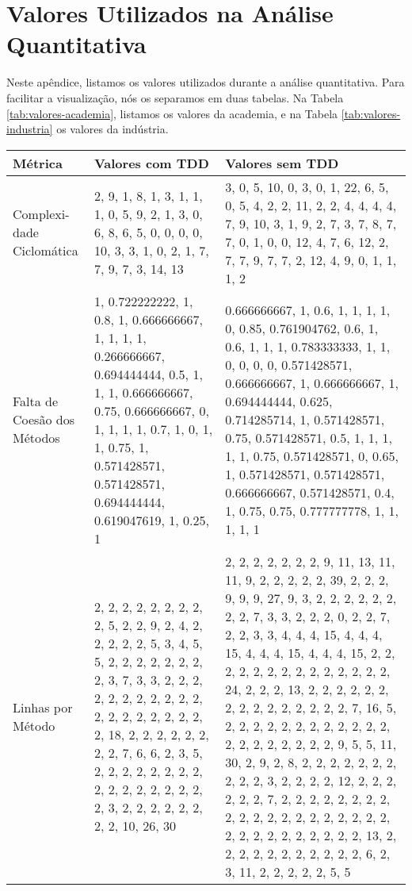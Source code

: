 \chapter{Valores Utilizados na Análise Quantitativa}
\label{ape:valores}

Neste apêndice, listamos os valores utilizados durante a 
análise quantitativa. Para facilitar a visualização, nós os separamos em duas tabelas.
Na Tabela \ref{tab:valores-academia}, listamos os valores da academia, e na Tabela
\ref{tab:valores-industria} os valores da indústria.

\begin{longtable}{| p{2cm} | p{6.5cm} | p{6.5cm} | }
		\hline
		Métrica & Valores com TDD & Valores sem TDD\\
		\hline
		Complexi- dade Ciclomática &	
		2, 9, 1, 8, 1, 3, 1, 1, 1, 0, 5, 9, 2, 1, 3, 0, 6, 8, 6, 5, 0, 0, 0, 0, 10, 3, 3, 1, 0, 2, 1, 7, 7, 9, 7, 3, 14, 13 &	
		
		3, 0, 5, 10, 0, 3, 0, 1, 22, 6, 5, 0, 5, 4, 2, 2, 11, 2, 2, 4, 4, 4, 4, 7, 9, 10, 3, 1, 9, 2, 7, 3, 7, 8, 7, 7, 0, 1, 0, 0, 12, 4, 7, 6, 12, 2, 7, 7, 9, 7, 7, 2, 12, 4, 9, 0, 1, 1, 1, 2\\
		
		\hline
		
		Falta de Coesão dos Métodos &	
		1, 0.722222222, 1, 0.8, 1, 0.666666667, 1, 1, 1, 1, 0.266666667, 0.694444444, 0.5, 1, 1, 1, 0.666666667, 0.75, 0.666666667, 0, 1, 1, 1, 1, 0.7, 1, 0, 1, 1, 0.75, 1, 0.571428571, 0.571428571, 0.694444444, 0.619047619, 1, 0.25, 1 &	
		
		0.666666667, 1, 0.6, 1, 1, 1, 1, 0, 0.85, 0.761904762, 0.6, 1, 0.6, 1, 1, 1, 0.783333333, 1, 1, 0, 0, 0, 0, 0.571428571, 0.666666667, 1, 0.666666667, 1, 0.694444444, 0.625, 0.714285714, 1, 0.571428571, 0.75, 0.571428571, 0.5, 1, 1, 1, 1, 1, 0.75, 0.571428571, 0, 0.65, 1, 0.571428571, 0.571428571, 0.666666667, 0.571428571, 0.4, 1, 0.75, 0.75, 0.777777778, 1, 1, 1, 1, 1\\
		
		\hline
		
		Linhas por Método &	
		2, 2, 2, 2, 2, 2, 2, 2, 2, 5, 2, 2, 9, 2, 4, 2, 2, 2, 2, 2, 5, 3, 4, 5, 5, 2, 2, 2, 2, 2, 2, 2, 2, 3, 7, 3, 3, 2, 2, 2, 2, 2, 2, 2, 2, 2, 2, 2, 2, 2, 2, 2, 2, 2, 2, 2, 2, 18, 2, 2, 2, 2, 2, 2, 2, 2, 7, 6, 6, 2, 3, 5, 2, 2, 2, 2, 2, 2, 2, 2, 2, 2, 2, 2, 2, 2, 2, 2, 2, 3, 2, 2, 2, 2, 2, 2, 2, 2, 10, 26, 30
		 &	
		
		2, 2, 2, 2, 2, 2, 2, 9, 11, 13, 11, 11, 9, 2, 2, 2, 2, 2, 39, 2, 2, 2, 9, 9, 9, 27, 9, 3, 2, 2, 2, 2, 2, 2, 2, 2, 7, 3, 3, 2, 2, 2, 0, 2, 2, 7, 2, 2, 3, 3, 4, 4, 4, 15, 4, 4, 4, 15, 4, 4, 4, 15, 4, 4, 4, 15, 2, 2, 2, 2, 2, 2, 2, 2, 2, 2, 2, 2, 2, 2, 24, 2, 2, 2, 13, 2, 2, 2, 2, 2, 2, 2, 2, 2, 2, 2, 2, 2, 2, 2, 7, 16, 5, 2, 2, 2, 2, 2, 2, 2, 2, 2, 2, 2, 2, 2, 2, 2, 2, 2, 2, 2, 2, 9, 5, 5, 11, 30, 2, 9, 2, 8, 2, 2, 2, 2, 2, 2, 2, 2, 2, 2, 3, 2, 2, 2, 2, 12, 2, 2, 2, 2, 2, 2, 7, 2, 2, 2, 2, 2, 2, 2, 2, 2, 2, 2, 2, 2, 2, 2, 2, 2, 2, 2, 2, 2, 2, 2, 2, 2, 2, 2, 2, 2, 2, 13, 2, 2, 2, 2, 2, 2, 2, 2, 2, 2, 2, 6, 2, 3, 11, 2, 2, 2, 2, 2, 5, 5
		\\
		

\end{longtable}
